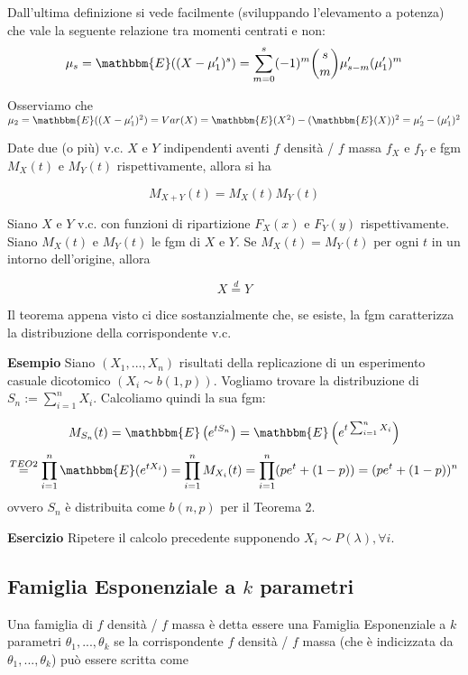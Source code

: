 \begin{teo}
Dall'ultima definizione si vede facilmente (sviluppando l'elevamento a potenza) che vale la seguente relazione tra momenti centrati e non:
$$\mu_s = \mathbbm{E} ((X-\mu'_1)^s) = \displaystyle\sum_{m=0}^s (-1)^m \binom{s}{m} \mu'_{s-m} (\mu'_1)^m$$
\end{teo}
Osserviamo che $\mu_2 = \mathbbm{E} ((X-\mu'_1)^2) = Var(X) = \mathbbm{E} (X^2) - (\mathbbm{E} (X))^2 = \mu'_2 - (\mu'_1)^2$


\begin{teo}
Date due (o più) v.c. $X$ e $Y$ indipendenti aventi $f$ densità / $f$ massa $f_X$ e $f_Y$ e fgm $M_X(t)$ e $M_Y(t)$ rispettivamente, allora si ha

$$M_{X+Y}(t) = M_X(t) M_Y(t)$$
\end{teo}

\begin{teo}
Siano $X$ e $Y$ v.c. con funzioni di ripartizione $F_X(x)$ e $F_Y(y)$ rispettivamente. Siano $M_X(t)$ e $M_Y(t)$ le fgm di $X$ e $Y$. Se $M_X(t) = M_Y(t)$ per ogni $t$ in un intorno dell'origine, allora 

$$X \stackrel{d}{=} Y$$
\end{teo}

\begin{oss}
Il teorema appena visto ci dice sostanzialmente che, se esiste, la fgm caratterizza la distribuzione della corrispondente v.c.
\end{oss}
\noindent \textbf{Esempio}
Siano $(X_1,...,X_n)$ risultati della replicazione di un esperimento casuale dicotomico $(X_i \sim b(1,p))$. Vogliamo trovare la distribuzione di $S_n := \displaystyle\sum_{i=1}^n X_i$. Calcoliamo quindi la sua fgm:

$$M_{S_n}(t) = \mathbbm{E} \left( {e^{t S_n}} \right)  = \mathbbm{E} \left( {e^{t \sum_{i=1}^n X_i}} \right) $$
$$\stackrel{TEO 2}
{=} \displaystyle\prod_{i=1}^n \mathbbm{E}({e^{tX_i}}) = \displaystyle\prod_{i=1}^n M_{X_i}(t) = \displaystyle\prod_{i=1}^n (p e^t + (1-p)) = (p e^t + (1-p))^n$$ ovvero $S_n$ è distribuita come $b(n,p)$ per il Teorema 2.

\noindent \textbf{Esercizio}
Ripetere il calcolo precedente supponendo $X_i \sim P(\lambda), \forall i$.

\subsection{Famiglia Esponenziale a $k$ parametri}
Una famiglia di $f$ densità / $f$ massa è detta essere una Famiglia Esponenziale a $k$ parametri $\theta_1,...,\theta_k$ se la corrispondente $f$ densità / $f$ massa (che è indicizzata da $\theta_1,...,\theta_k$) può essere scritta come

